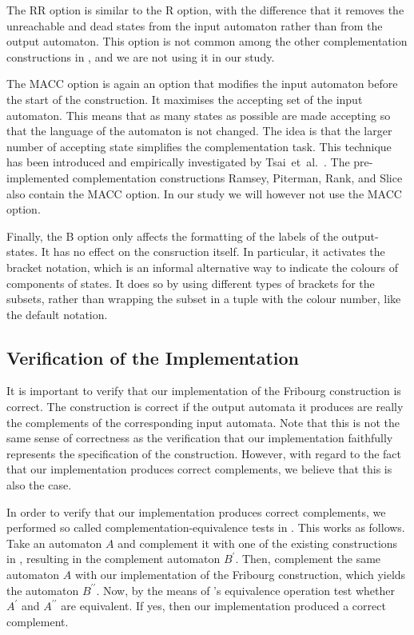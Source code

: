The RR option is similar to the R option, with the difference that it removes the unreachable and dead states from the input automaton rather than from the output automaton. This option is not common among the other complementation constructions in \goal, and we are not using it in our study.

The MACC option is again an option that modifies the input automaton before the start of the construction. It maximises the accepting set of the input automaton. This means that as many states as possible are made accepting so that the language of the automaton is not changed. The idea is that the larger number of accepting state simplifies the complementation task. This technique has been introduced and empirically investigated by Tsai~et~al.~\cite{2011_tsai}. The pre-implemented complementation constructions Ramsey, Piterman, Rank, and Slice also contain the MACC option. In our study we will however not use the MACC option.

Finally, the B option only affects the formatting of the labels of the output-states. It has no effect on the consruction itself. In particular, it activates the bracket notation, which is an informal alternative way to indicate the colours of components of states. It does so by using different types of brackets for the subsets, rather than wrapping the subset in a tuple with the colour number, like the default notation.


\subsection{Verification of the Implementation}
\label{4_verification}
It is important to verify that our implementation of the Fribourg construction is correct. The construction is correct if the output automata it produces are really the complements of the corresponding input automata. Note that this is not the same sense of correctness as the verification that our implementation faithfully represents the specification of the construction. However, with regard to the fact that our implementation produces correct complements, we believe that this is also the case.

In order to verify that our implementation produces correct complements, we performed so called complementation-equivalence tests in \goal. This works as follows. Take an automaton $A$ and complement it with one of the existing constructions in \goal, resulting in the complement automaton $B^\prime$. Then, complement the same automaton $A$ with our implementation of the Fribourg construction, which yields the automaton $B^{\prime\prime}$. Now, by the means of \goal's equivalence operation test whether $A^\prime$ and $A^{\prime\prime}$ are equivalent. If yes, then our implementation produced a correct complement.

